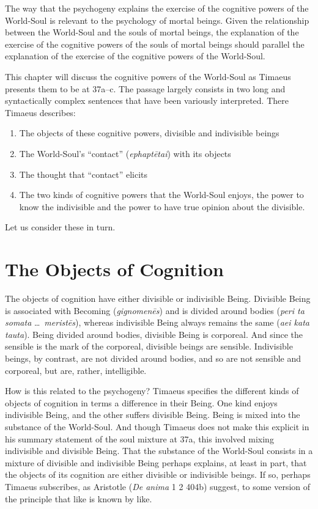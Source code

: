 The way that the psychogeny explains the exercise of the cognitive powers of the World-Soul is relevant to the psychology of mortal beings. Given the relationship between the World-Soul and the souls of mortal beings, the explanation of the exercise of the cognitive powers of the souls of mortal beings should parallel the explanation of the exercise of the cognitive powers of the World-Soul. 

This chapter will discuss the cognitive powers of the World-Soul as Timaeus presents them to be at 37a--c. The passage largely consists in two long and syntactically complex sentences that have been variously interpreted. There Timaeus describes:
\begin{enumerate}[(1)]
	\item The objects of these cognitive powers, divisible and indivisible beings
	\item The World-Soul's ``contact'' (\emph{ephaptētai}) with its objects
	\item The thought that ``contact'' elicits
	\item The two kinds of cognitive powers that the World-Soul enjoys, the power to know the indivisible and the power to have true opinion about the divisible.
\end{enumerate}
Let us consider these in turn.


\section{The Objects of Cognition} %
\label{sec:the_objects_of_cognition}

The objects of cognition have either divisible or indivisible Being. Divisible Being is associated with Becoming (\emph{gignomenēs}) and is divided around bodies (\emph{peri ta somata} \ldots\ \emph{meristēs}), whereas indivisible Being always remains the same (\emph{aei kata tauta}). Being divided around bodies, divisible Being is corporeal. And since the sensible is the mark of the corporeal, divisible beings are sensible. Indivisible beings, by contrast, are not divided around bodies, and so are not sensible and corporeal, but are, rather, intelligible.

How is this related to the psychogeny? Timaeus specifies the different kinds of objects of cognition in terms a difference in their Being. One kind enjoys indivisible Being, and the other suffers divisible Being. Being is mixed into the substance of the World-Soul. And though Timaeus does not make this explicit in his summary statement of the soul mixture at 37a, this involved mixing indivisible and divisible Being. That the substance of the World-Soul consists in a mixture of divisible and indivisible Being perhaps explains, at least in part, that the objects of its cognition are either divisible or indivisible beings. If so, perhaps Timaeus subscribes, as Aristotle (\emph{De anima} 1 2 404b) suggest, to some version of the principle that like is known by like. 

